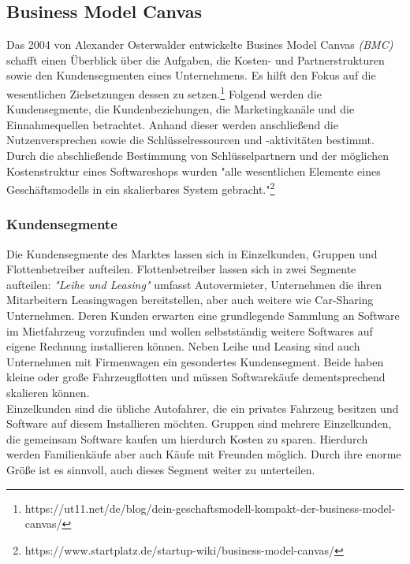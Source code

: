 
\subsection{Business Model Canvas}
Das 2004 von Alexander Osterwalder entwickelte Busines Model Canvas \textit{(BMC)} schafft einen Überblick über die Aufgaben, die Kosten- und Partnerstrukturen sowie den Kundensegmenten eines Unternehmens. Es hilft den Fokus auf die wesentlichen Zielsetzungen dessen zu setzen.\footnote{https://ut11.net/de/blog/dein-geschaftsmodell-kompakt-der-business-model-canvas/} Folgend werden die Kundensegmente, die Kundenbeziehungen, die Marketingkanäle und die Einnahmequellen betrachtet. Anhand dieser werden anschließend die Nutzenversprechen sowie die Schlüsselressourcen und -aktivitäten bestimmt. Durch die abschließende Bestimmung von Schlüsselpartnern und der möglichen Kostenstruktur eines Softwareshops wurden "alle wesentlichen Elemente eines Geschäftsmodells in ein skalierbares System gebracht."\footnote{https://www.startplatz.de/startup-wiki/business-model-canvas/}

\subsubsection{Kundensegmente}
Die Kundensegmente des Marktes lassen sich in Einzelkunden, Gruppen und Flottenbetreiber aufteilen. Flottenbetreiber lassen sich in zwei Segmente aufteilen: \textit{"Leihe und Leasing"} umfasst Autovermieter, Unternehmen die ihren Mitarbeitern Leasingwagen bereitstellen, aber auch weitere wie Car-Sharing Unternehmen. Deren Kunden erwarten eine grundlegende Sammlung an Software im Mietfahrzeug vorzufinden und wollen selbstständig weitere Softwares auf eigene Rechnung installieren können. Neben Leihe und Leasing sind auch Unternehmen mit Firmenwagen ein gesondertes Kundensegment. Beide haben kleine oder große Fahrzeugflotten und müssen Softwarekäufe dementsprechend skalieren können. \\
Einzelkunden sind die übliche Autofahrer, die ein privates Fahrzeug besitzen und Software auf diesem Installieren möchten. Gruppen sind mehrere Einzelkunden, die gemeinsam Software kaufen um hierdurch Kosten zu sparen. Hierdurch werden Familienkäufe aber auch Käufe mit Freunden möglich. Durch ihre enorme Größe ist es sinnvoll, auch dieses Segment weiter zu unterteilen.

